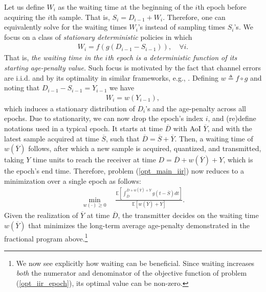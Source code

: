 \documentclass[12pt,journal,onecolumn]{IEEEtran}
\begin{document}
Let us define $W_i$ as the waiting time at the beginning of the $i$th epoch before acquiring the $i$th sample. That is, $S_i=D_{i-1}+W_i$. Therefore, one can equivalently solve for the waiting times $W_i$'s instead of sampling times $S_i$'s. We focus on a class of {\it stationary deterministic} policies in which
\begin{align}
W_i=f\left(g\left(D_{i-1}-S_{i-1}\right)\right),\quad\forall i.
\end{align}
That is, {\it the waiting time in the $i$th epoch is a deterministic function of its starting age-penalty value.} Such focus is motivated by the fact that channel errors are i.i.d. and by its optimality in similar frameworks, e.g., \cite{sun-age-mdp, jing-age-online, arafa-age-online-finite}. Defining $w\triangleq f\circ g$ and noting that $D_{i-1}-S_{i-1}=Y_{i-1}$ we have
\begin{align}
W_i=w\left(Y_{i-1}\right),
\end{align}
which induces a stationary distribution of $D_i$'s and the age-penalty across all epochs. Due to stationarity, we can now drop the epoch's index $i$, and (re)define notations used in a typical epoch. It starts at time $\overline{D}$ with AoI $\overline{Y}$, and with the latest sample acquired at time $\overline{S}$, such that $\overline{D}=\overline{S}+\overline{Y}$. Then, a waiting time of $w\left(\overline{Y}\right)$ follows, after which a new sample is acquired, quantized, and transmitted, taking $Y$ time units to reach the receiver at time $D=\overline{D}+w\left(\overline{Y}\right)+Y$, which is the epoch's end time. Therefore, problem (\ref{opt_main_iir}) now reduces to a minimization over a single epoch as follows:
\begin{align} \label{opt_iir_epoch}
\min_{w(\cdot)\geq0}\quad\frac{\mathbb{E}\left[\int_{\overline{D}}^{\overline{D}+w\left(\overline{Y}\right)+Y}g\left(t-\overline{S}\right)dt\right]}{\mathbb{E}\left[w\left(\overline{Y}\right)+Y\right]}.
\end{align}
Given the realization of $\overline{Y}$ at time $\overline{D}$, the transmitter decides on the waiting time $w\left(\overline{Y}\right)$ that minimizes the long-term average age-penalty demonstrated in the fractional program above.\footnote{We now see explicitly how waiting can be beneficial. Since waiting increases {\it both} the numerator and denominator of the objective function of problem (\ref{opt_iir_epoch}), its optimal value can be non-zero.} 
\end{document}
